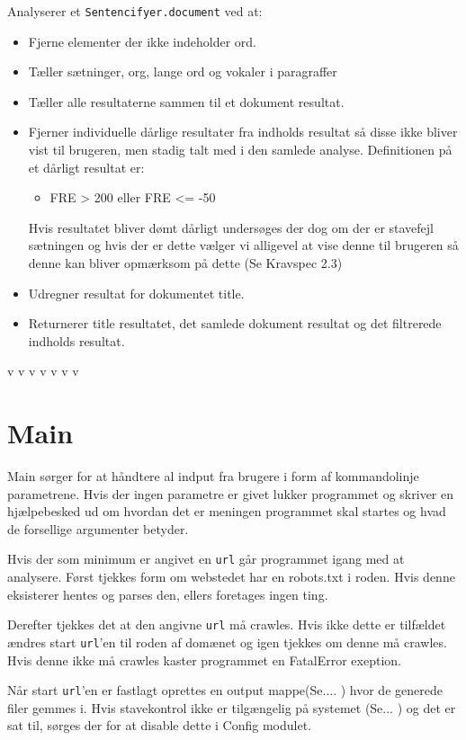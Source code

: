 \documentclass[a4paper,oneside,article]{memoir}
\begin{document}
Analyserer et \texttt{Sentencifyer.document} ved at:
\begin{itemize}
 \item Fjerne elementer der ikke indeholder ord.
 \item Tæller sætninger, org, lange ord og vokaler i paragraffer
 \item Tæller alle resultaterne sammen til et dokument resultat.
 \item Fjerner individuelle dårlige resultater fra indholds resultat
   så disse ikke bliver vist til brugeren, men stadig talt med i den
   samlede analyse. Definitionen på et dårligt resultat er:
   \begin{itemize}
   \item FRE > 200 eller FRE <= -50
   \end{itemize}
   Hvis resultatet bliver dømt dårligt undersøges der dog om der er
   stavefejl sætningen og hvis der er dette vælger vi alligevel at
   vise denne til brugeren så denne kan bliver opmærksom på dette (Se
   Kravspec 2.3)
 \item Udregner resultat for dokumentet title.
 \item Returnerer title resultatet, det samlede dokument resultat og det filtrerede indholds resultat.
\end{itemize}

v v v v v v v
\section{Main}

Main sørger for at håndtere al indput fra brugere i form af
kommandolinje parametrene. Hvis der ingen parametre er givet lukker
programmet og skriver en hjælpebesked ud om hvordan det er meningen
programmet skal startes og hvad de forsellige argumenter betyder.

Hvis der som minimum er angivet en \texttt{url} går programmet igang
med at analysere.  Først tjekkes form om webstedet har en robots.txt i
roden. Hvis denne eksisterer hentes og parses den, ellers foretages
ingen ting.

Derefter tjekkes det at den angivne \texttt{url} må crawles. Hvis ikke
dette er tilfældet ændres start \texttt{url}'en til roden af domænet
og igen tjekkes om denne må crawles. Hvis denne ikke må crawles kaster
programmet en FatalError exeption.

Når start \texttt{url}'en er fastlagt oprettes en output mappe(Se....
) hvor de generede filer gemmes i.
Hvis stavekontrol ikke er tilgængelig på systemet
(Se... ) og det er sat til, sørges der for at
disable dette i Config modulet.
\end{document}
